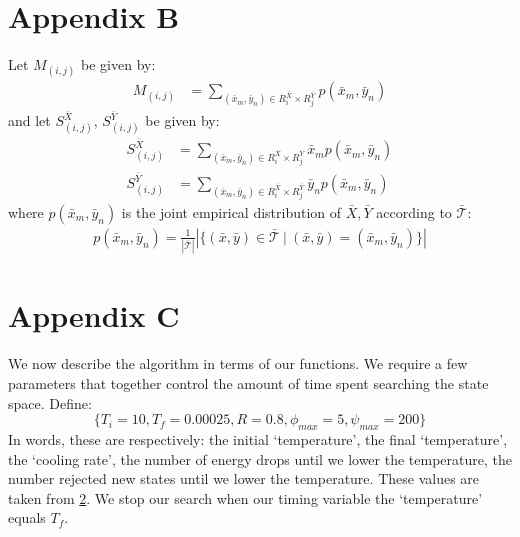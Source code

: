 \section{Appendix B}
Let $M_{(i,j)}$ be given by:
\begin{align}
    M_{(i,j)} &=
    \sum_{(\bar x_m,\bar y_n)\in R_i^{\bar X}\times R_j^{\bar Y}}p(\bar x_m,\bar y_n)
\end{align}
and let $S_{(i,j)}^{\bar X}$, $S_{(i,j)}^{\bar Y}$ be given by:
\begin{align}
    S^{\bar X}_{(i,j)} &=
    \sum_{(\bar x_m,\bar y_n)\in R_i^{\bar X}\times R_j^{\bar Y}}\bar x_m p(\bar x_m,\bar y_n)\\
    S^{\bar Y}_{(i,j)} &=
    \sum_{(\bar x_m,\bar y_n)\in R_i^{\bar X}\times R_j^{\bar Y}}\bar y_n p(\bar x_m,\bar y_n)
\end{align}
where $p(\bar x_m,\bar y_n)$ is the joint empirical distribution of $\bar X,\bar Y$ according to $\mathcal{\bar T}$:
\begin{align}
    p(\bar x_m,\bar y_n)=\frac{1}{|\mathcal{\bar T}|}\left|\{(\bar x,\bar y)\in\mathcal{\bar T}\ |\ (\bar x,\bar y)=(\bar x_m,\bar y_n)\}\right|
\end{align}

\section{Appendix C}

We now describe the algorithm in terms of our functions. We require a few parameters that together control the amount of time spent searching the state space. Define:
\begin{equation}
    \{T_i=10,T_f=0.00025,R=0.8,\phi_{max}=5,\psi_{max}=200\}
\end{equation}
In words, these are respectively: the initial `temperature', the final `temperature', the `cooling rate', the number of energy drops until we lower the temperature, the number rejected new states until we lower the temperature. These values are taken from \ref{}. We stop our search when our timing variable the `temperature' equals $T_f$.

